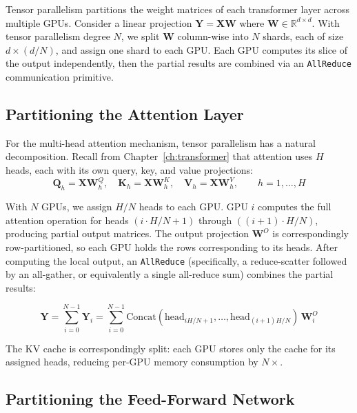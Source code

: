 %
Tensor parallelism partitions the weight matrices of each transformer layer across multiple GPUs. Consider a linear projection $\mathbf{Y} = \mathbf{X}\mathbf{W}$ where $\mathbf{W} \in \mathbb{R}^{d \times d}$. With tensor parallelism degree $N$, we split $\mathbf{W}$ column-wise into $N$ shards, each of size $d \times (d/N)$, and assign one shard to each GPU. Each GPU computes its slice of the output independently, then the partial results are combined via an \texttt{AllReduce} communication primitive.

\subsection{Partitioning the Attention Layer}

For the multi-head attention mechanism, tensor parallelism has a natural decomposition. Recall from Chapter~\ref{ch:transformer} that attention uses $H$ heads, each with its own query, key, and value projections:
\begin{equation}
\mathbf{Q}_h = \mathbf{X}\mathbf{W}^Q_h, \quad
\mathbf{K}_h = \mathbf{X}\mathbf{W}^K_h, \quad
\mathbf{V}_h = \mathbf{X}\mathbf{W}^V_h, \qquad h = 1, \ldots, H
\end{equation}

With $N$ GPUs, we assign $H/N$ heads to each GPU. GPU $i$ computes the full attention operation for heads $(i \cdot H/N + 1)$ through $((i+1) \cdot H/N)$, producing partial output matrices. The output projection $\mathbf{W}^O$ is correspondingly row-partitioned, so each GPU holds the rows corresponding to its heads. After computing the local output, an \texttt{AllReduce} (specifically, a reduce-scatter followed by an all-gather, or equivalently a single all-reduce sum) combines the partial results:

\begin{equation}
\mathbf{Y} = \sum_{i=0}^{N-1} \mathbf{Y}_i = \sum_{i=0}^{N-1} \text{Concat}(\text{head}_{iH/N+1}, \ldots, \text{head}_{(i+1)H/N}) \, \mathbf{W}^O_i
\end{equation}

The KV cache is correspondingly split: each GPU stores only the cache for its assigned heads, reducing per-GPU memory consumption by $N\times$.

\subsection{Partitioning the Feed-Forward Network}

